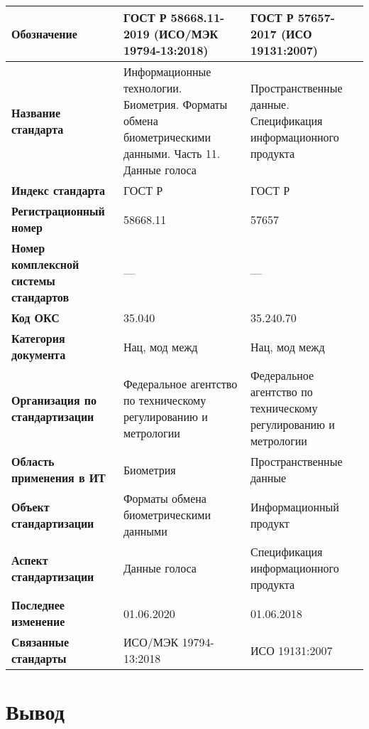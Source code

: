 \begin{table}[h!tp]
	\centering
	\caption{}
	\label{table:national:international:mod}
	\begin{tabular}{|p{10em}|p{12em}|p{12em}|}
		\hline
		\textbf{Обозначение}
			& \textbf{ГОСТ Р 58668.11-2019 (ИСО/МЭК 19794-13:2018)}
			& \textbf{ГОСТ Р 57657-2017 (ИСО 19131:2007)} \\ \hline
		\textbf{Название стандарта}
			& Информационные технологии. Биометрия. Форматы обмена биометрическими данными. Часть 11. Данные голоса
			& Пространственные данные. Спецификация информационного продукта \\ \hline
		\textbf{Индекс стандарта}
			& ГОСТ Р & ГОСТ Р \\ \hline
		\textbf{Регистрационный номер}
			& 58668.11 & 57657 \\ \hline
		\textbf{Номер комплексной системы стандартов}
			& --- & --- \\ \hline
		\textbf{Код ОКС}
			& 35.040 & 35.240.70 \\ \hline
		\textbf{Категория документа}
			& Нац, мод межд & Нац, мод межд \\ \hline
		\textbf{Организация по стандартизации}
			& Федеральное агентство по техническому регулированию и метрологии
			& Федеральное агентство по техническому регулированию и метрологии \\ \hline
		\textbf{Область применения в ИТ}
			& Биометрия & Пространственные данные \\ \hline
		\textbf{Объект стандартизации}
			& Форматы обмена биометрическими данными
			& Информационный продукт \\ \hline
		\textbf{Аспект стандартизации}
			& Данные голоса & Спецификация информационного продукта \\ \hline
		\textbf{Последнее изменение}
			& 01.06.2020 & 01.06.2018 \\ \hline
		\textbf{Связанные стандарты}
			& ИСО/МЭК 19794-13:2018 & ИСО 19131:2007 \\ \hline
	\end{tabular}
\end{table}

\clearpage

\section*{\LARGE Вывод}

